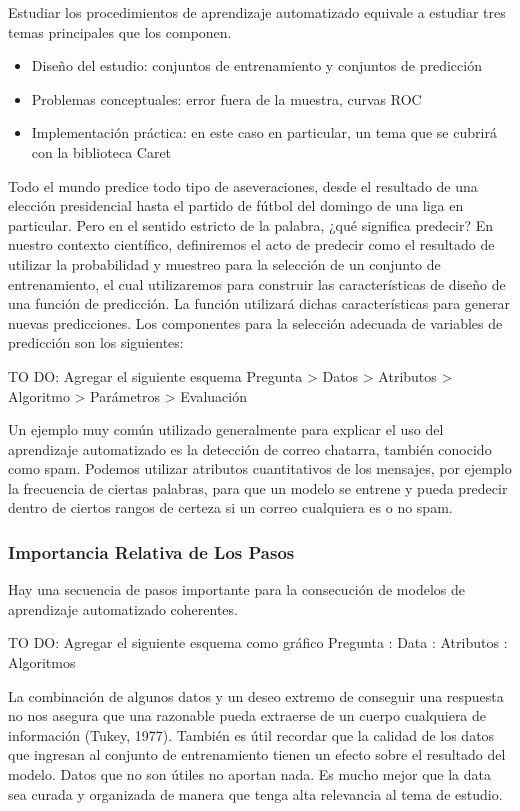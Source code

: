 \documentclass[letterpaper, spanish, 11pt]{report}
\begin{document}
Estudiar los procedimientos de aprendizaje automatizado equivale a estudiar tres temas principales que los componen.

\begin{itemize}
	\item Diseño del estudio: conjuntos de entrenamiento y conjuntos de predicción
	\item Problemas conceptuales: error fuera de la muestra, curvas ROC
	\item Implementación práctica: en este caso en particular, un tema que se cubrirá con la biblioteca Caret
\end{itemize}

Todo el mundo predice todo tipo de aseveraciones, desde el resultado de una elección presidencial hasta el partido de fútbol del domingo de una liga en particular. Pero en el sentido estricto de la palabra, ¿qué significa predecir? En nuestro contexto científico, definiremos el acto de predecir como el resultado de utilizar la probabilidad y muestreo para la selección de un conjunto de entrenamiento, el cual utilizaremos para construir las características de diseño de una función de predicción. La función utilizará dichas características para generar nuevas predicciones.  Los componentes para la selección adecuada de variables de predicción son los siguientes:

TO DO: Agregar el siguiente esquema
Pregunta > Datos > Atributos > Algoritmo > Parámetros > Evaluación

Un ejemplo muy común utilizado generalmente para explicar el uso del aprendizaje automatizado es la detección de correo chatarra, también conocido como spam. Podemos utilizar atributos cuantitativos de los mensajes, por ejemplo la frecuencia de ciertas palabras, para que un modelo se entrene y pueda predecir dentro de ciertos rangos de certeza si un correo cualquiera es o no spam. 

\subsubsection{Importancia Relativa de Los Pasos}

Hay una secuencia de pasos importante para la consecución de modelos de aprendizaje automatizado coherentes.

TO DO: Agregar el siguiente esquema como gráfico
Pregunta : Data : Atributos : Algoritmos

La combinación de algunos datos y un deseo extremo de conseguir una respuesta no nos asegura que una razonable pueda extraerse de un cuerpo cualquiera de información (Tukey, 1977). También es útil recordar que la calidad de los datos que ingresan al conjunto de entrenamiento tienen un efecto sobre el resultado del modelo. Datos que no son útiles no aportan nada. Es mucho mejor que la data sea curada y organizada de manera que tenga alta relevancia al tema de estudio. 
\end{document}
